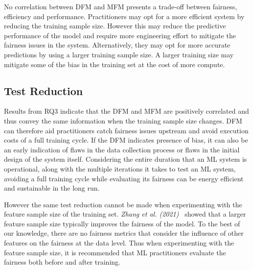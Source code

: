 \documentclass[conference]{IEEEtran}
\begin{document}
No correlation between DFM and MFM presents a trade-off between
fairness, efficiency and performance. Practitioners may opt for a more
efficient system by reducing the training sample size. However this
may reduce the predictive performance of the model and require more
engineering effort to mitigate the fairness issues in the system.
Alternatively, they may opt for more accurate predictions by using a
larger training sample size. A larger training size may mitigate some
of the bias in the training set at the cost of more compute.

\subsection{Test Reduction}\label{sec:discuss-test-red}

Results from RQ3 indicate that the DFM and MFM are positively
correlated and thus convey the same information when the training
sample size changes. DFM can therefore aid practitioners catch
fairness issues upstream and avoid execution costs of a full training
cycle. If the DFM indicates presence of bias, it can also be an early
indication of flaws in the data collection process or flaws in the
initial design of the system itself. Considering the entire duration
that an ML system is operational, along with the multiple iterations
it takes to test an ML system, avoiding a full training cycle while
evaluating its fairness can be energy efficient and sustainable in the
long run.

However the same test reduction cannot be made when experimenting with the feature sample size of the training set. \emph{Zhang et al. (2021)}~\cite{zhang2021ignorance} showed that a larger feature sample size typically improves the fairness of the model. To the best of our knowledge, there are no fairness metrics that consider the influence of other features on the fairness at the data level. Thus when experimenting with the feature sample size, it is recommended that ML practitioners evaluate the fairness both before and after training.


\end{document}
